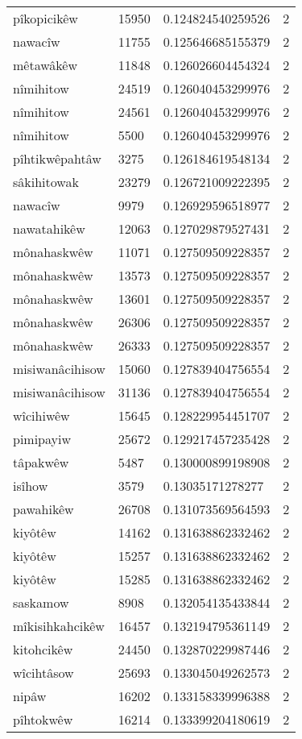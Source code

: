 \begin{longtable}{llll}
pîkopicikêw & 15950 & 0.124824540259526 & 2 \\
nawacîw & 11755 & 0.125646685155379 & 2 \\
mêtawâkêw & 11848 & 0.126026604454324 & 2 \\
nîmihitow & 24519 & 0.126040453299976 & 2 \\
nîmihitow & 24561 & 0.126040453299976 & 2 \\
nîmihitow & 5500 & 0.126040453299976 & 2 \\
pîhtikwêpahtâw & 3275 & 0.126184619548134 & 2 \\
sâkihitowak & 23279 & 0.126721009222395 & 2 \\
nawacîw & 9979 & 0.126929596518977 & 2 \\
nawatahikêw & 12063 & 0.127029879527431 & 2 \\
mônahaskwêw & 11071 & 0.127509509228357 & 2 \\
mônahaskwêw & 13573 & 0.127509509228357 & 2 \\
mônahaskwêw & 13601 & 0.127509509228357 & 2 \\
mônahaskwêw & 26306 & 0.127509509228357 & 2 \\
mônahaskwêw & 26333 & 0.127509509228357 & 2 \\
misiwanâcihisow & 15060 & 0.127839404756554 & 2 \\
misiwanâcihisow & 31136 & 0.127839404756554 & 2 \\
wîcihiwêw & 15645 & 0.128229954451707 & 2 \\
pimipayiw & 25672 & 0.129217457235428 & 2 \\
tâpakwêw & 5487 & 0.130000899198908 & 2 \\
isîhow & 3579 & 0.13035171278277 & 2 \\
pawahikêw & 26708 & 0.131073569564593 & 2 \\
kiyôtêw & 14162 & 0.131638862332462 & 2 \\
kiyôtêw & 15257 & 0.131638862332462 & 2 \\
kiyôtêw & 15285 & 0.131638862332462 & 2 \\
saskamow & 8908 & 0.132054135433844 & 2 \\
mîkisihkahcikêw & 16457 & 0.132194795361149 & 2 \\
kitohcikêw & 24450 & 0.132870229987446 & 2 \\
wîcihtâsow & 25693 & 0.133045049262573 & 2 \\
nipâw & 16202 & 0.133158339996388 & 2 \\
pîhtokwêw & 16214 & 0.133399204180619 & 2 \\

\end{longtable}
